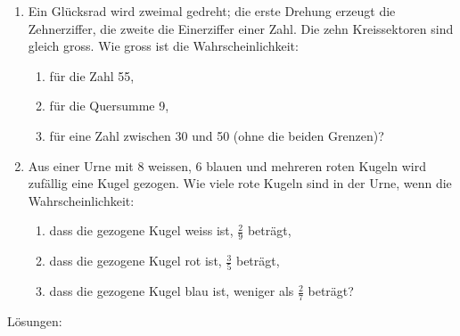 \begin{ueb}
\begin{enumerate}
        \item Ein Glücksrad wird zweimal gedreht; die erste Drehung erzeugt die Zehnerziffer, die zweite die Einerziffer einer Zahl. Die zehn Kreissektoren sind gleich gross. Wie gross ist die Wahrscheinlichkeit:
        \begin{enumerate}
            \item für die Zahl 55,
            \item für die Quersumme 9,
            \item für eine Zahl zwischen 30 und 50 (ohne die beiden Grenzen)?
        \end{enumerate}
        \item Aus einer Urne mit 8 weissen, 6 blauen und mehreren roten Kugeln wird zufällig eine Kugel gezogen. Wie viele rote Kugeln sind in der Urne, wenn die Wahrscheinlichkeit:
        \begin{enumerate}
            \item dass die gezogene Kugel weiss ist, $\frac{2}{9}$ beträgt,
            \item dass die gezogene Kugel rot ist, $\frac{3}{5}$ beträgt,
            \item dass die gezogene Kugel blau ist, weniger als $\frac{2}{7}$ beträgt?
        \end{enumerate}
    
\end{enumerate}
\end{ueb}

\clearpage
Lösungen:

